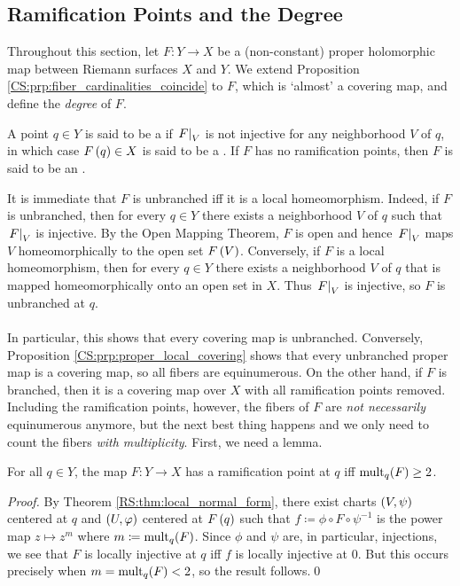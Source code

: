 \documentclass[../Moduli_Spaces_of_Riemann_Surfaces.tex]{subfiles}
\begin{document}
    \subsection{Ramification Points and the Degree}
    Throughout this section, let $F:Y\to X$ be a (non-constant) proper holomorphic map between Riemann surfaces $X$ and $Y$. We extend Proposition \ref{CS:prp:fiber_cardinalities_coincide} to $F$, which is `almost' a covering map, and define the \textit{degree} of $F$.
    \begin{definition}
        A point $q\in Y$ is said to be a  if $\left.F\right|_V$ is not injective for any neighborhood $V$ of $q$, in which case $F\left(q\right)\in X$ is said to be a . If $F$ has no ramification points, then $F$ is said to be an .
    \end{definition}
    \begin{remark}
        It is immediate that $F$ is unbranched iff it is a local homeomorphism. Indeed, if $F$ is unbranched, then for every $q\in Y$ there exists a neighborhood $V$ of $q$ such that $\left.F\right|_V$ is injective. By the Open Mapping Theorem, $F$ is open and hence $\left.F\right|_V$ maps $V$ homeomorphically to the open set $F\left(V\right)$. Conversely, if $F$ is a local homeomorphism, then for every $q\in Y$ there exists a neighborhood $V$ of $q$ that is mapped homeomorphically onto an open set in $X$. Thus $\left.F\right|_V$ is injective, so $F$ is unbranched at $q$.\\\ \\
        In particular, this shows that every covering map is unbranched. Conversely, Proposition \ref{CS:prp:proper_local_covering} shows that every unbranched proper map is a covering map, so all fibers are equinumerous. On the other hand, if $F$ is branched, then it is a covering map over $X$ with all ramification points removed. Including the ramification points, however, the fibers of $F$ are \textit{not necessarily} equinumerous anymore, but the next best thing happens and we only need to count the fibers \textit{with multiplicity}. First, we need a lemma.\exqed
    \end{remark}
    \begin{lemma}\label{CS:lem:ramification_iff_mult_2}
        For all $q\in Y$, the map $F:Y\to X$ has a ramification point at $q$ iff $\operatorname{mult}_q\!\left(F\right)\geq2$.
    \end{lemma}
    \begin{proof}
        By Theorem \ref{RS:thm:local_normal_form}, there exist charts $\left(V,\psi\right)$ centered at $q$ and $\left(U,\varphi\right)$ centered at $F\left(q\right)$ such that $f\coloneqq\phi\circ F\circ\psi^{-1}$ is the power map $z\mapsto z^m$ where $m\coloneqq\operatorname{mult}_q\!\left(F\right)$. Since $\phi$ and $\psi$ are, in particular, injections, we see that $F$ is locally injective at $q$ iff $f$ is locally injective at $0$. But this occurs precisely when $m=\operatorname{mult}_q\!\left(F\right)<2$, so the result follows.\qed
    \end{proof}
\end{document}
